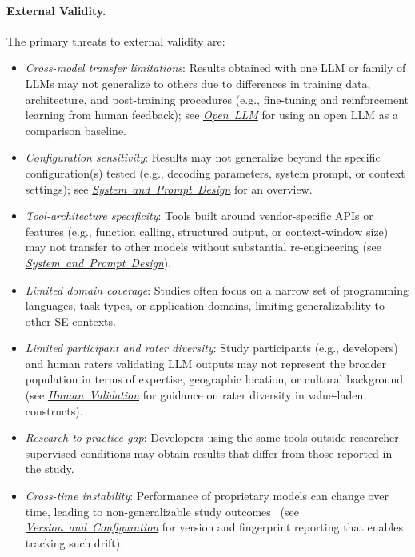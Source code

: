 \documentclass[smallextended]{svjour3}
\newcommand{\modelversion}{\hyperref[sec:report-model-version-configuration-and-customizations]{\mbox{\emph{Version and Configuration}}}\xspace}
\newcommand{\design}{\hyperref[sec:report-system-and-prompt-design]{\mbox{\emph{System and Prompt Design}}}\xspace}
\newcommand{\openllm}{\hyperref[sec:use-an-open-llm-as-a-baseline]{\mbox{\emph{Open LLM}}}\xspace}
\newcommand{\humanvalidation}{\hyperref[sec:use-human-validation-for-llm-outputs]{\mbox{\emph{Human Validation}}}\xspace}
\newcommand{\modelversion}{\href{/guidelines/model-version/}{\emph{Version and Configuration}}\xspace}
\newcommand{\design}{\href{/guidelines/design/}{\emph{System and Prompt Design}}\xspace}
\newcommand{\openllm}{\href{/guidelines/open-llm/}{\emph{Open LLM}}\xspace}
\newcommand{\humanvalidation}{\href{/guidelines/human-validation/}{\emph{Human Validation}}\xspace}
\newcommand{\guidelineparagraph}[1]{\paragraph{#1.}}
\newcommand{\guidelineparagraph}[1]{\paragraph{#1}}
\begin{document}
\guidelineparagraph{External Validity}
The primary threats to external validity are:
\begin{itemize}
    \item \emph{Cross-model transfer limitations}: Results obtained with one LLM or family of LLMs may not generalize to others due to differences in training data, architecture, and post-training procedures (e.g., fine-tuning and reinforcement learning from human feedback); see \openllm for using an open LLM as a comparison baseline.
    \item \emph{Configuration sensitivity}: Results may not generalize beyond the specific configuration(s) tested (e.g., decoding parameters, system prompt, or context settings); see \design for an overview.
    \item \emph{Tool-architecture specificity}: Tools built around vendor-specific APIs or features (e.g., function calling, structured output, or context-window size) may not transfer to other models without substantial re-engineering (see \design).
    \item \emph{Limited domain coverage}: Studies often focus on a narrow set of programming languages, task types, or application domains, limiting generalizability to other SE contexts.
    \item \emph{Limited participant and rater diversity}: Study participants (e.g., developers) and human raters validating LLM outputs may not represent the broader population in terms of expertise, geographic location, or cultural background (see \humanvalidation for guidance on rater diversity in value-laden constructs).
    \item \emph{Research-to-practice gap}: Developers using the same tools outside researcher-supervised conditions may obtain results that differ from those reported in the study.
    \item \emph{Cross-time instability}: Performance of proprietary models can change over time, leading to non-generalizable study outcomes~\cite{DBLP:journals/corr/abs-2307-09009, doi:10.1148/radiol.232411} (see \modelversion for version and fingerprint reporting that enables tracking such drift).
\end{itemize}
\end{document}
